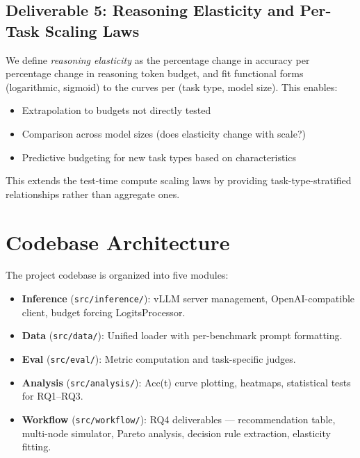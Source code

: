 \documentclass[11pt]{article}
\begin{document}
\subsection{Deliverable 5: Reasoning Elasticity and Per-Task Scaling Laws}

We define \emph{reasoning elasticity} as the percentage change in accuracy per percentage change in reasoning token budget, and fit functional forms (logarithmic, sigmoid) to the curves per (task type, model size). This enables:
\begin{itemize}[nosep]
    \item Extrapolation to budgets not directly tested
    \item Comparison across model sizes (does elasticity change with scale?)
    \item Predictive budgeting for new task types based on characteristics
\end{itemize}
This extends the test-time compute scaling laws \citep{snell2024scaling} by providing task-type-stratified relationships rather than aggregate ones.

\section{Codebase Architecture}

The project codebase is organized into five modules:

\begin{itemize}[nosep]
    \item \textbf{Inference} (\texttt{src/inference/}): vLLM server management, OpenAI-compatible client, budget forcing LogitsProcessor.
    \item \textbf{Data} (\texttt{src/data/}): Unified loader with per-benchmark prompt formatting.
    \item \textbf{Eval} (\texttt{src/eval/}): Metric computation and task-specific judges.
    \item \textbf{Analysis} (\texttt{src/analysis/}): Acc(t) curve plotting, heatmaps, statistical tests for RQ1--RQ3.
    \item \textbf{Workflow} (\texttt{src/workflow/}): RQ4 deliverables --- recommendation table, multi-node simulator, Pareto analysis, decision rule extraction, elasticity fitting.
\end{itemize}
\end{document}
